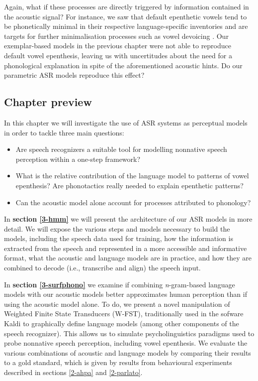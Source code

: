 Again, what if these processes are directly triggered by information contained in the acoustic signal?
For instance, we saw that default epenthetic vowels tend to be phonetically minimal in their respective language-specific inventories \cite{guekozIS17} and are targets for further minimalisation processes such as vowel devoicing \cite{dupoux2011}. Our exemplar-based models in the previous chapter were not able to reproduce default vowel epenthesis, leaving us with uncertitudes about the need for a phonological explanation in spite of the aforementioned acoustic hints. Do our parametric ASR models reproduce this effect?  

\subsection{Chapter preview}
In this chapter we will investigate the use of ASR systems as perceptual models in order to tackle three main questions: 

\begin{itemize}
\item Are speech recognizers a suitable tool for modelling nonnative speech perception within a one-step framework?
\item What is the relative contribution of the language model to patterns of vowel epenthesis? Are phonotactics really needed to explain epenthetic patterns?
\item Can the acoustic model alone account for processes attributed to phonology? 
\end{itemize}

In \textbf{section \ref{3-hmm}} we will present the architecture of our ASR models in more detail. We will expose the various steps and models necessary to build the models, including the speech data used for training, how the information is extracted from the speech and represented in a more accessible and informative format, what the acoustic and language models are in practice, and how they are combined to decode (i.e., transcribe and align) the speech input.  

In \textbf{section \ref{3-surfphono}} we examine if combining \textit{n}-gram-based language models with our acoustic models better approximates human perception than if using the acoustic model alone. To do, we present a novel manipulation of Weighted Finite State Transducers (W-FST), traditionally used in the sofware Kaldi \cite{povey2011} to graphically define language models (among other components of the speech recognizer). This allows us to simulate psycholinguistics paradigms used to probe nonnative speech perception, including vowel epenthesis. We evaluate the various combinations of acoustic and language models by comparing their results to a gold standard, which is given by results from behavioural experiments described in sections \ref{2-ahpa} and \ref{2-parlato}.  


